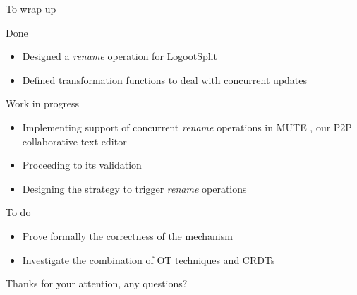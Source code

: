 \documentclass[10pt]{beamer}
\begin{document}
\begin{frame}{To wrap up}
  \begin{block}{Done}
    \vspace{-1mm}
    \begin{itemize}
      \item Designed a \emph{rename} operation for LogootSplit
      \item Defined transformation functions to deal with concurrent updates
    \end{itemize}
  \end{block}

  \pause

  \begin{block}{Work in progress}
    \vspace{-1mm}
    \begin{itemize}
      \item Implementing support of concurrent \emph{rename} operations in MUTE , our P2P collaborative text editor
      \item Proceeding to its validation
      \item Designing the strategy to trigger \emph{rename} operations
    \end{itemize}
  \end{block}

  \pause

  \begin{block}{To do}
    \vspace{-1mm}
    \begin{itemize}
      \item Prove formally the correctness of the mechanism
      \item Investigate the combination of OT techniques and CRDTs
    \end{itemize}
  \end{block}
\end{frame}

\begin{frame}[standout]
  Thanks for your attention, any questions?
  \vspace{3em}
  \begin{center}
    \ccby
  \end{center}
\end{frame}
\end{document}
